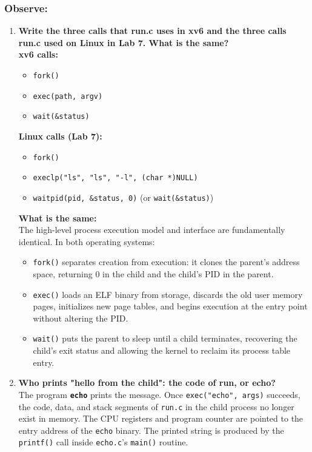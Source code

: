 \documentclass{labreport}
\begin{document}
\subsubsection*{Observe:}
\begin{enumerate}[leftmargin=*]
    \item \textbf{Write the three calls that run.c uses in xv6 and the three calls run.c used on Linux in Lab 7. What is the same?}\\[0.2em]
    \textbf{xv6 calls:}
    \begin{itemize}[noitemsep]
        \item \texttt{fork()}
        \item \texttt{exec(path, argv)}
        \item \texttt{wait(\&status)}
    \end{itemize}
    \textbf{Linux calls (Lab 7):}
    \begin{itemize}[noitemsep]
        \item \texttt{fork()}
        \item \texttt{execlp("ls", "ls", "-l", (char *)NULL)}
        \item \texttt{waitpid(pid, \&status, 0)} (or \texttt{wait(\&status)})
    \end{itemize}
    \textbf{What is the same:}\\
    The high-level process execution model and interface are fundamentally identical. In both operating systems:
    \begin{itemize}[noitemsep]
        \item \texttt{fork()} separates creation from execution: it clones the parent's address space, returning 0 in the child and the child's PID in the parent.
        \item \texttt{exec()} loads an ELF binary from storage, discards the old user memory pages, initializes new page tables, and begins execution at the entry point without altering the PID.
        \item \texttt{wait()} puts the parent to sleep until a child terminates, recovering the child's exit status and allowing the kernel to reclaim its process table entry.
    \end{itemize}

    \item \textbf{Who prints "hello from the child": the code of run, or echo?}\\[0.2em]
    The program \textbf{\texttt{echo}} prints the message. Once \texttt{exec("echo", args)} succeeds, the code, data, and stack segments of \texttt{run.c} in the child process no longer exist in memory. The CPU registers and program counter are pointed to the entry address of the \texttt{echo} binary. The printed string is produced by the \texttt{printf()} call inside \texttt{echo.c}'s \texttt{main()} routine.


\end{enumerate}
\end{document}
